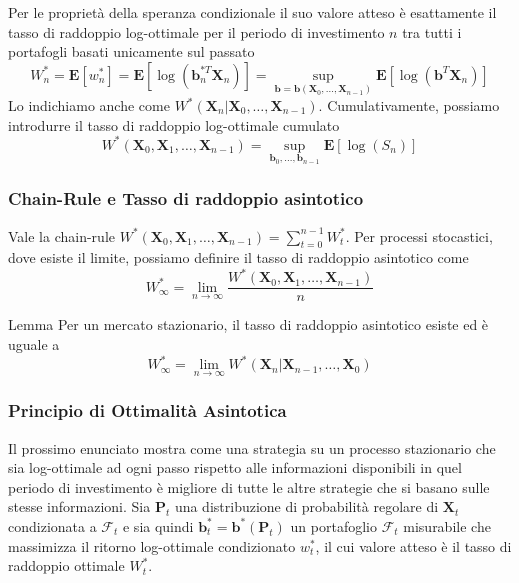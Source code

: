 \documentclass{beamer}
\theoremstyle{plain}
\theoremstyle{definition}
\theoremstyle{remark}
\newcommand{\X}{\bm{X}}
\newcommand{\B}{\bm{b}}
\newcommand{\F}{\mathcal{F}}
\newcommand{\Pro}{\mathbf{P}}
\newcommand{\E}{\mathbf{E}}
\begin{document}
\begin{frame}
	Per le proprietà della speranza condizionale il suo valore atteso è esattamente il tasso di raddoppio log-ottimale per il periodo di investimento $n$ tra tutti i portafogli basati unicamente sul passato		\begin{equation*}\label{def:tasso-cond}
		W^*_n=\E[w_n^*] = \E[\log(\B_n^{*T}\X_n)] = \sup\limits_{\bm{b}=\B(\X_0,\ldots, \X_{n-1})}\E[\log(\B^T\X_n)]
	\end{equation*}
	Lo indichiamo anche come $W^*(\X_n|\X_0,\ldots,\X_{n-1})$.\newline
	Cumulativamente, possiamo introdurre il tasso di raddoppio log-ottimale cumulato
	\begin{equation}\label{def:tasso-cum}
		W^*(\X_0,\X_1,\ldots,\X_{n-1}) = \sup\limits_{\B_0,\ldots, \B_{n-1}}\E[\log(S_n)]
		\end{equation}
\end{frame}

\begin{frame}
	\frametitle{Chain-Rule e Tasso di raddoppio asintotico}
	Vale la chain-rule $W^*(\X_0,\X_1,\ldots,\X_{n-1})=\sum_{t = 0}^{n-1}{W^*_t}$.\newline
	Per processi stocastici, dove esiste il limite, possiamo definire il tasso di raddoppio asintotico come		\begin{equation*}
		W^*_\infty=\lim\limits_{n\to \infty}\frac{W^*(\X_0,\X_1,\ldots,\X_{n-1})}{n}
		\end{equation*}
	\begin{block}{Lemma}
		Per un mercato stazionario, il tasso di raddoppio asintotico esiste ed è uguale a 
		\begin{equation*}
		W^*_\infty=\lim\limits_{n\to\infty}W^*(\X_n|\X_{n-1},\ldots,\X_0)
		\end{equation*}
	\end{block}
\end{frame}


\begin{frame}
	\frametitle{Principio di Ottimalità Asintotica}
	Il prossimo enunciato mostra come una strategia su un processo stazionario che sia log-ottimale ad ogni passo rispetto alle informazioni disponibili in quel periodo di investimento è migliore di tutte le altre strategie che si basano sulle stesse informazioni.\newline
	Sia  $\Pro_t$ una distribuzione di probabilità regolare di $\X_t$ condizionata a $\F_t$ e sia quindi $\B^*_t = \B^*(\Pro_t)$ un portafoglio $\F_t$ misurabile che massimizza il ritorno log-ottimale condizionato $w_t^*$, il cui valore atteso è il tasso di raddoppio ottimale $W_t^*$.
\end{frame}
\end{document}
